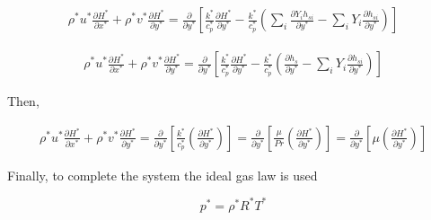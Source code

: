 \begin{equation} 
\begin{split} 
\rho^* u^* \frac{\partial H^*}{\partial x^*}
+
\rho^* v^* \frac{\partial H^*}{\partial y^*}
=
\frac{\partial}{\partial y^*}
\left[
        \frac{ k^*}{c_p^*} 
        \frac{\partial H^*}{\partial y^*}
        -
        \frac{ k^*}{c_p^*} 
        \left(
            \sum_i
            \frac{\partial Y_i h_{si}}{\partial y^*}
            -
            \sum_i
            Y_i
            \frac{\partial  h_{si}}{\partial y^*}
        \right)
\right]
\end{split} 
\end{equation} 

\begin{equation} 
\begin{split} 
\rho^* u^* \frac{\partial H^*}{\partial x^*}
+
\rho^* v^* \frac{\partial H^*}{\partial y^*}
=
\frac{\partial}{\partial y^*}
\left[
        \frac{ k^*}{c_p^*} 
        \frac{\partial H^*}{\partial y^*}
        -
        \frac{ k^*}{c_p^*} 
        \left(
            \frac{\partial  h_s}{\partial y^*}
            -
            \sum_i
            Y_i
            \frac{\partial  h_{si}}{\partial y^*}
        \right)
\right]
\end{split} 
\end{equation} 


Then, 

\begin{equation} 
\begin{split} 
\rho^* u^* \frac{\partial H^*}{\partial x^*}
+
\rho^* v^* \frac{\partial H^*}{\partial y^*}
=
\frac{\partial}{\partial y^*}
\left[
    \frac{ k^*}{c_p^*} 
    \left(
        \frac{\partial H^*}{\partial y^*}
   \right)
\right]
=
\frac{\partial}{\partial y^*}
\left[
    \frac{ \mu}{Pr} 
    \left(
        \frac{\partial H^*}{\partial y^*}
   \right)
\right]
=
\frac{\partial}{\partial y^*}
\left[
    \mu 
    \left(
        \frac{\partial H^*}{\partial y^*}
   \right)
\right]
\end{split} 
\end{equation} 

Finally, to complete the system the ideal gas law 
is used  

\begin{equation} 
p^*=\rho^*R^*T^*
\end{equation} 


